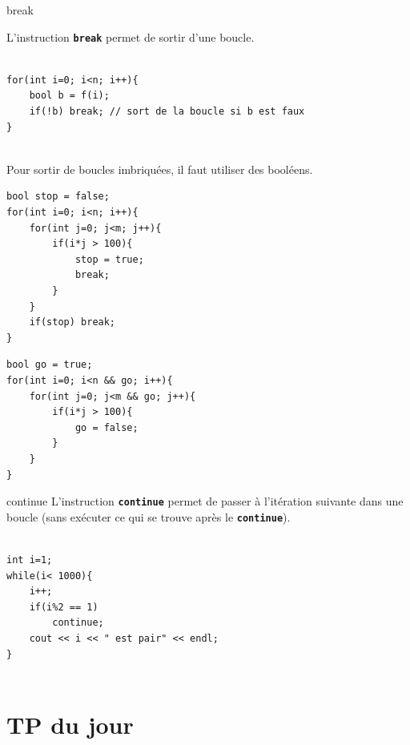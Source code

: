 \begin{frame}[fragile=singleslide]{break}

    L'instruction \textbf{\texttt{break}} permet de sortir d'une boucle.
    \vspace{-0.1cm}
    \begin{verbatim}
        
for(int i=0; i<n; i++){
    bool b = f(i);
    if(!b) break; // sort de la boucle si b est faux
}
        
    \end{verbatim}

    \vspace{-0.1cm}
Pour sortir de boucles imbriquées, il faut utiliser des booléens.
    \vspace{-0.1cm}
\begin{minipage}{0.47\linewidth}
    \begin{verbatim}   
bool stop = false;
for(int i=0; i<n; i++){
    for(int j=0; j<m; j++){
        if(i*j > 100){
            stop = true;
            break;
        }
    }
    if(stop) break;
}
    \end{verbatim}
\end{minipage}
\hfill
\begin{minipage}{0.47\linewidth}
    \begin{verbatim}   
bool go = true;
for(int i=0; i<n && go; i++){
    for(int j=0; j<m && go; j++){
        if(i*j > 100){
            go = false;
        }
    }
}     
    \end{verbatim}
\end{minipage}

\end{frame}

\begin{frame}[fragile=singleslide]{continue}
L'instruction \texttt{\textbf{continue}} permet de passer à l'itération suivante dans une boucle (sans exécuter ce qui se trouve après le \texttt{\textbf{continue}}).

\begin{verbatim}
    
int i=1;
while(i< 1000){
    i++;
    if(i%2 == 1)
        continue;
    cout << i << " est pair" << endl;
}
    
\end{verbatim}

\end{frame}

\section{TP du jour}

